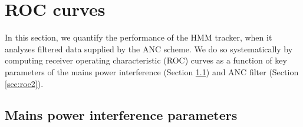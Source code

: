 \documentclass[pra,superscriptaddress,reprint,amsmath,amssymb,nofootinbib]{revtex4-2}
\begin{document}
\section{ROC curves}\label{sec:theroccurves}



In this section, we quantify the performance of the HMM tracker, when it analyzes filtered data supplied by the ANC scheme. We do so systematically by computing receiver operating characteristic (ROC) curves as a function of key parameters of the mains power interference (Section \ref{sec:roc1}) and ANC filter (Section \ref{sec:roc2}).

\subsection{Mains power interference parameters} \label{sec:roc1}

\end{document}
